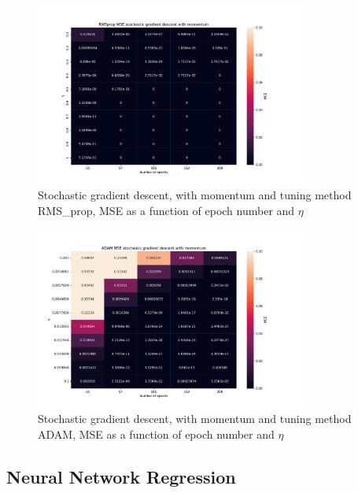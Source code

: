 \begin{figure}[H]
\centering
\includegraphics[width=0.8\textwidth]{Figures/PartA/RMSprop_sgdm_MSE(eta,epochs)}
\caption{Stochastic gradient descent, with momentum and tuning method RMS\_prop, MSE as a function of epoch number and \(\eta \)	 }
\label{fig:RMSprop_sgdm_MSE-eta-epochs-}
\end{figure}

\begin{figure}[H]
\centering
\includegraphics[width=0.8\textwidth]{Figures/PartA/ADAM_sgdm_MSE(eta,epochs)}
\caption{Stochastic gradient descent, with momentum and tuning method ADAM, MSE as a function of epoch number and \(\eta \)	 }
\label{fig:ADAM_sgdm_MSE-eta-epochs-}
\end{figure}


\subsection{Neural Network Regression}

